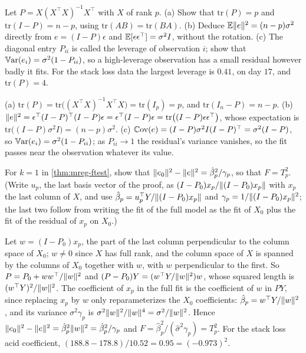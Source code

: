 \begin{exercise}
\label{ex:mreg-projection}
Let $P = X(X^\top X)^{-1}X^\top$ with $X$ of rank $p$. (a) Show that $\mathrm{tr}(P) = p$ and $\mathrm{tr}(I - P) = n - p$, using $\mathrm{tr}(AB) = \mathrm{tr}(BA)$. (b) Deduce $\operatorname*{\mathbb{E}}\lVert e\rVert^2 = (n - p)\sigma^2$ directly from $e = (I - P)\epsilon$ and $\operatorname*{\mathbb{E}}[\epsilon\epsilon^\top] = \sigma^2I$, without the rotation. (c) The diagonal entry $P_{ii}$ is called the leverage of observation $i$; show that $\operatorname*{\mathbb{V}\text{ar}}(e_i) = \sigma^2(1 - P_{ii})$, so a high-leverage observation has a small residual however badly it fits. For the stack loss data the largest leverage is $0.41$, on day $17$, and $\mathrm{tr}(P) = 4$.
\end{exercise}
\begin{solution}
(a) $\mathrm{tr}(P) = \mathrm{tr}\big((X^\top X)^{-1}X^\top X\big) = \mathrm{tr}(I_p) = p$, and $\mathrm{tr}(I_n - P) = n - p$. (b) $\lVert e\rVert^2 = \epsilon^\top(I - P)^\top(I - P)\epsilon = \epsilon^\top(I - P)\epsilon = \mathrm{tr}\big((I - P)\epsilon\epsilon^\top\big)$, whose expectation is $\mathrm{tr}\big((I - P)\sigma^2I\big) = (n - p)\sigma^2$. (c) $\operatorname*{\mathbb{C}\text{ov}}(e) = (I - P)\sigma^2I(I - P)^\top = \sigma^2(I - P)$, so $\operatorname*{\mathbb{V}\text{ar}}(e_i) = \sigma^2(1 - P_{ii})$; as $P_{ii} \to 1$ the residual's variance vanishes, so the fit passes near the observation whatever its value.
\end{solution}

\begin{exercise}
\label{ex:mreg-t-f}
For $k = 1$ in \cref{thm:mreg-ftest}, show that $\lVert e_0\rVert^2 - \lVert e\rVert^2 = \hat{\beta}_p^2/\gamma_p$, so that $F = T_p^2$. (Write $u_p$, the last basis vector of the proof, as $(I - P_0)x_p/\lVert(I - P_0)x_p\rVert$ with $x_p$ the last column of $X$, and use $\hat{\beta}_p = u_p^\top Y/\lVert(I - P_0)x_p\rVert$ and $\gamma_p = 1/\lVert(I - P_0)x_p\rVert^2$; the last two follow from writing the fit of the full model as the fit of $X_0$ plus the fit of the residual of $x_p$ on $X_0$.)
\end{exercise}
\begin{solution}
Let $w = (I - P_0)x_p$, the part of the last column perpendicular to the column space of $X_0$; $w \neq 0$ since $X$ has full rank, and the column space of $X$ is spanned by the columns of $X_0$ together with $w$, with $w$ perpendicular to the first. So $P = P_0 + ww^\top/\lVert w\rVert^2$ and $(P - P_0)Y = (w^\top Y/\lVert w\rVert^2)w$, whose squared length is $(w^\top Y)^2/\lVert w\rVert^2$. The coefficient of $x_p$ in the full fit is the coefficient of $w$ in $PY$, since replacing $x_p$ by $w$ only reparameterizes the $X_0$ coefficients: $\hat{\beta}_p = w^\top Y/\lVert w\rVert^2$, and its variance $\sigma^2\gamma_p$ is $\sigma^2\lVert w\rVert^2/\lVert w\rVert^4 = \sigma^2/\lVert w\rVert^2$. Hence $\lVert e_0\rVert^2 - \lVert e\rVert^2 = \hat{\beta}_p^2\lVert w\rVert^2 = \hat{\beta}_p^2/\gamma_p$ and $F = \hat{\beta}_p^2/(\hat{\sigma}^2\gamma_p) = T_p^2$. For the stack loss acid coefficient, $(188.8 - 178.8)/10.52 = 0.95 = (-0.973)^2$.
\end{solution}

